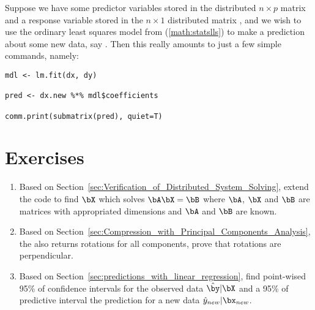 Suppose we have some predictor variables stored in the distributed
$n\times p$ matrix  and a response variable stored
in the $n\times 1$ distributed matrix , and we wish to use the
ordinary least squares model from (\ref{math:statslls}) to make a
prediction about some new data, say . Then this really
amounts to just a few simple commands, namely:
\begin{lstlisting}[language=rr]
mdl <- lm.fit(dx, dy)

pred <- dx.new %*% mdl$coefficients

comm.print(submatrix(pred), quiet=T)
\end{lstlisting}




\section{Exercises}
\label{sec:pmclust_exercise}

\begin{enumerate}[label=\thechapter-\arabic*]

\item
Based on Section~\ref{sec:Verification_of_Distributed_System_Solving},
extend the code to find $\bX$ which solves $\bA\bX = \bB$
where $\bA$, $\bX$ and $\bB$ are matrices with
appropriated dimensions and $\bA$ and $\bB$ are known.

\item
Based on Section~\ref{sec:Compression_with_Principal_Components_Analysis},
the  also returns rotations for all components,
prove that rotations are perpendicular.

\item
Based on Section~\ref{sec:predictions_with_linear_regression},
find point-wised 95\% of confidence intervals for the observed data
$\hat{\by}|\bX$ and a 95\% of predictive interval
the prediction for a new data $\hat{y}_{new}|\bx_{new}$.

\end{enumerate}

